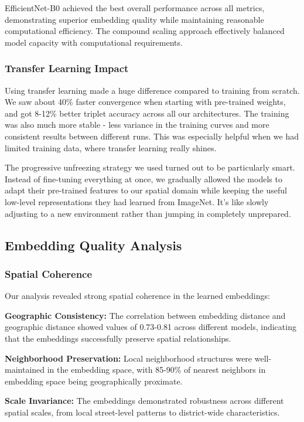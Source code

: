 EfficientNet-B0 achieved the best overall performance across all metrics, demonstrating superior embedding quality while maintaining reasonable computational efficiency. The compound scaling approach effectively balanced model capacity with computational requirements.

\subsubsection{Transfer Learning Impact}

Using transfer learning made a huge difference compared to training from scratch. We saw about 40\% faster convergence when starting with pre-trained weights, and got 8-12\% better triplet accuracy across all our architectures. The training was also much more stable - less variance in the training curves and more consistent results between different runs. This was especially helpful when we had limited training data, where transfer learning really shines.

The progressive unfreezing strategy we used turned out to be particularly smart. Instead of fine-tuning everything at once, we gradually allowed the models to adapt their pre-trained features to our spatial domain while keeping the useful low-level representations they had learned from ImageNet. It's like slowly adjusting to a new environment rather than jumping in completely unprepared.

\subsection{Embedding Quality Analysis}

\subsubsection{Spatial Coherence}

Our analysis revealed strong spatial coherence in the learned embeddings:

\textbf{Geographic Consistency:} The correlation between embedding distance and geographic distance showed values of 0.73-0.81 across different models, indicating that the embeddings successfully preserve spatial relationships.

\textbf{Neighborhood Preservation:} Local neighborhood structures were well-maintained in the embedding space, with 85-90\% of nearest neighbors in embedding space being geographically proximate.

\textbf{Scale Invariance:} The embeddings demonstrated robustness across different spatial scales, from local street-level patterns to district-wide characteristics.

